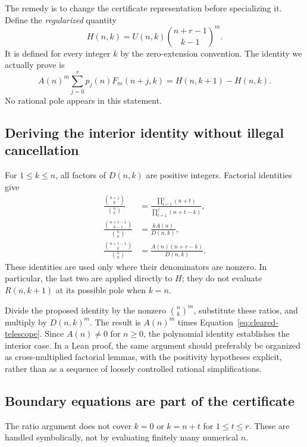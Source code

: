 The remedy is to change the certificate representation before specializing it.
Define the \emph{regularized} quantity
\begin{equation}
 H(n,k)=U(n,k)\binom{n+r-1}{k-1}^{m}.
 \label{eq:regularized-H}
\end{equation}
It is defined for every integer $k$ by the zero-extension convention. The
identity we actually prove is
\begin{equation}
 A(n)^m\sum_{j=0}^{r}p_j(n)F_m(n+j,k)
   =H(n,k+1)-H(n,k).
 \label{eq:regularized-telescope}
\end{equation}
No rational pole appears in this statement.

\subsection{Deriving the interior identity without illegal cancellation}

For $1\le k\le n$, all factors of $D(n,k)$ are positive integers. Factorial
identities give
\begin{align*}
 \frac{\binom{n+j}{k}}{\binom nk}
 &=\frac{\prod_{t=1}^{j}(n+t)}{\prod_{t=1}^{j}(n+t-k)},\\
 \frac{\binom{n+r-1}{k-1}}{\binom nk}
 &=\frac{kA(n)}{D(n,k)},\\
 \frac{\binom{n+r-1}{k}}{\binom nk}
 &=\frac{A(n)(n+r-k)}{D(n,k)}.
\end{align*}
These identities are used only where their denominators are nonzero. In
particular, the last two are applied directly to $H$; they do not evaluate
$R(n,k+1)$ at its possible pole when $k=n$.

Divide the proposed identity by the nonzero $\binom nk^m$, substitute these
ratios, and multiply by $D(n,k)^m$. The result is $A(n)^m$ times
Equation~\eqref{eq:cleared-telescope}. Since $A(n)\ne0$ for $n\ge0$, the
polynomial identity establishes the interior case. In a Lean proof, the same
argument should preferably be organized as cross-multiplied factorial lemmas,
with the positivity hypotheses explicit, rather than as a sequence of loosely
controlled rational simplifications.

\subsection{Boundary equations are part of the certificate}

The ratio argument does not cover $k=0$ or $k=n+t$ for $1\le t\le r$. These
are handled symbolically, not by evaluating finitely many numerical $n$.

